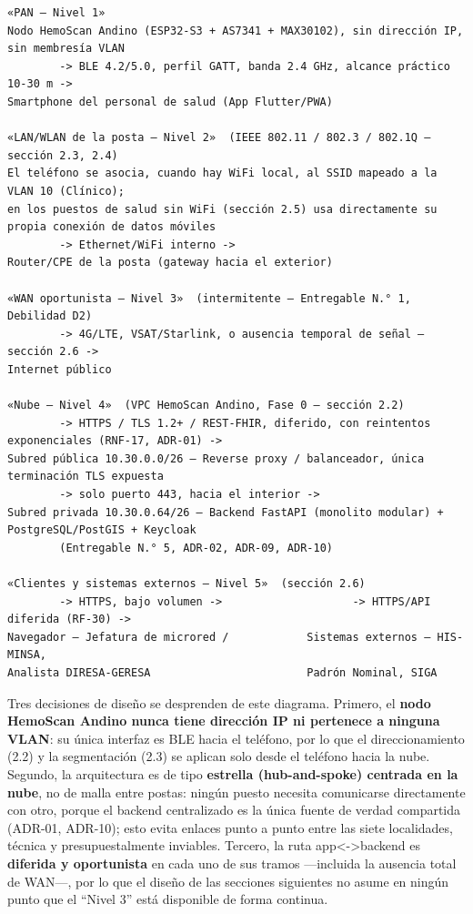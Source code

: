 \documentclass[11pt,a4paper]{article}
\begin{document}
\begin{samepage}\begin{verbatim}
«PAN — Nivel 1»
Nodo HemoScan Andino (ESP32-S3 + AS7341 + MAX30102), sin dirección IP, sin membresía VLAN
        -> BLE 4.2/5.0, perfil GATT, banda 2.4 GHz, alcance práctico 10-30 m ->
Smartphone del personal de salud (App Flutter/PWA)

«LAN/WLAN de la posta — Nivel 2»  (IEEE 802.11 / 802.3 / 802.1Q — sección 2.3, 2.4)
El teléfono se asocia, cuando hay WiFi local, al SSID mapeado a la VLAN 10 (Clínico);
en los puestos de salud sin WiFi (sección 2.5) usa directamente su propia conexión de datos móviles
        -> Ethernet/WiFi interno ->
Router/CPE de la posta (gateway hacia el exterior)

«WAN oportunista — Nivel 3»  (intermitente — Entregable N.° 1, Debilidad D2)
        -> 4G/LTE, VSAT/Starlink, o ausencia temporal de señal — sección 2.6 ->
Internet público

«Nube — Nivel 4»  (VPC HemoScan Andino, Fase 0 — sección 2.2)
        -> HTTPS / TLS 1.2+ / REST-FHIR, diferido, con reintentos exponenciales (RNF-17, ADR-01) ->
Subred pública 10.30.0.0/26 — Reverse proxy / balanceador, única terminación TLS expuesta
        -> solo puerto 443, hacia el interior ->
Subred privada 10.30.0.64/26 — Backend FastAPI (monolito modular) + PostgreSQL/PostGIS + Keycloak
        (Entregable N.° 5, ADR-02, ADR-09, ADR-10)

«Clientes y sistemas externos — Nivel 5»  (sección 2.6)
        -> HTTPS, bajo volumen ->                    -> HTTPS/API diferida (RF-30) ->
Navegador — Jefatura de microred /            Sistemas externos — HIS-MINSA,
Analista DIRESA-GERESA                        Padrón Nominal, SIGA
\end{verbatim}\end{samepage}

Tres decisiones de diseño se desprenden de este diagrama. Primero, el \textbf{nodo HemoScan Andino nunca tiene dirección IP ni pertenece a ninguna VLAN}: su única interfaz es BLE hacia el teléfono, por lo que el direccionamiento (2.2) y la segmentación (2.3) se aplican solo desde el teléfono hacia la nube. Segundo, la arquitectura es de tipo \textbf{estrella (hub-and-spoke) centrada en la nube}, no de malla entre postas: ningún puesto necesita comunicarse directamente con otro, porque el backend centralizado es la única fuente de verdad compartida (ADR-01, ADR-10); esto evita enlaces punto a punto entre las siete localidades, técnica y presupuestalmente inviables. Tercero, la ruta app\textless-\textgreater backend es \textbf{diferida y oportunista} en cada uno de sus tramos ---incluida la ausencia total de WAN---, por lo que el diseño de las secciones siguientes no asume en ningún punto que el ``Nivel 3'' está disponible de forma continua.
\end{document}
